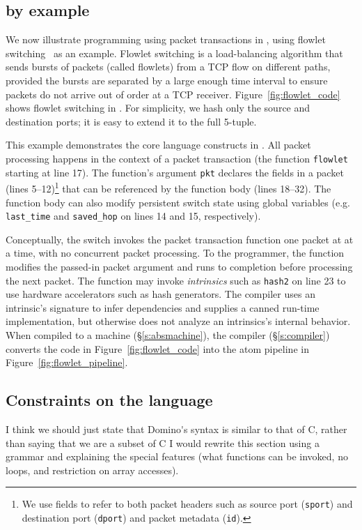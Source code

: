 \subsection{\pktlanguage by example}
\label{ss:flowlet}

We now illustrate programming using packet transactions in \pktlanguage, using
flowlet switching~\cite{flowlets} as an example. Flowlet switching is a
load-balancing algorithm that sends bursts of packets (called flowlets) from a
TCP flow on different paths, provided the bursts are separated by a large
enough time interval to ensure packets do not arrive out of order at a TCP
receiver. Figure~\ref{fig:flowlet_code} shows flowlet switching in
\pktlanguage. For simplicity, we hash only the source and destination ports; it
is easy to extend it to the full 5-tuple.

This example demonstrates the core language constructs in \pktlanguage. All
packet processing happens in the context of a packet transaction (the function
\texttt{flowlet} starting at line 17). The function's argument {\tt pkt}
declares the fields in a packet (lines 5--12)\footnote{We use fields to refer
to both packet headers such as source port ({\tt sport}) and destination port
({\tt dport}) and packet metadata ({\tt id}).} that can be referenced by the
function body (lines 18--32).  The function body can also modify persistent
switch state using global variables (e.g.  \texttt{last\_time} and
\texttt{saved\_hop} on lines 14 and 15, respectively).

Conceptually, the switch invokes the packet transaction function one packet at
at a time, with no concurrent packet processing. To the programmer, the
function modifies the passed-in packet argument and runs to completion before
processing the next packet.  The function may invoke \textit{intrinsics} such
as \texttt{hash2} on line 23 to use hardware accelerators such as hash
generators.  The \pktlanguage compiler uses an intrinsic's signature to infer
dependencies and supplies a canned run-time implementation, but otherwise does
not analyze an intrinsics's internal behavior. When compiled to a \absmachine
machine (\S\ref{s:absmachine}), the \pktlanguage compiler (\S\ref{s:compiler})
converts the code in Figure~\ref{fig:flowlet_code} into the atom pipeline in
Figure~\ref{fig:flowlet_pipeline}.

\subsection{Constraints on the language}
\label{ss:constraints}
\ac{I think we should just state that Domino's syntax is similar to that of C, 
rather than saying that we are a subset of C}
\ac{I would rewrite this section using a grammar and explaining the special
features (what functions can be invoked, no loops, 
and restriction on array accesses).}

